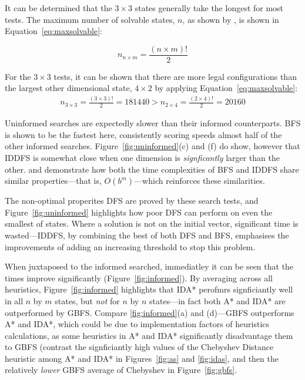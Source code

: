 It can be determined that the $3 \times 3$ states generally take the longest for
most tests. The maximum number of solvable states, $n$, as shown by
\citet{gong2000}, is shown in Equation~\ref{eq:maxsolvable}:

\begin{equation}\label{eq:maxsolvable}
  n_{n \times m} = \frac{(n \times m)!}{2}
\end{equation}

For the $3 \times 3$ tests, it can be shown that there are more legal configurations
than the largest other dimensional state, $4 \times 2$ by applying
Equation~\ref{eq:maxsolvable}:
\begin{align*}\label{eq:3by3larger}
  n_{3 \times 3} = \frac{( 3 \times 3 )!}{2} = 181440 > n_{2 \times 4} = \frac{( 2 \times 4 )!}{2} = 20160
\end{align*}

Uninformed searches are expectedly slower than their informed counterparts. BFS is
shown to be the fastest here, consistently scoring speeds almost half of the
other informed searches. Figure~\ref{fig:uninformed}(c) and (f) do show, however
that IDDFS is somewhat close when one dimension is \emph{signficantly} larger than
the other. \citet{amackworth1998} and \citet{canderson2012} demonstrate how both the time
complexities of BFS and IDDFS share similar properties---that is, $O(b^{m})$---which
reinforces these similarities.

The non-optimal properites DFS are proved by these search tests, and Figure~\ref{fig:uninformed}
highlights how poor DFS can perform on even the smallest of states. Where a solution
is not on the initial vector, significant time is wasted---IDDFS, by combining
the best of both DFS and BFS, emphasises the improvements of adding an increasing
threshold to stop this problem.

When juxtaposed to the informed searched, immediatley it can be seen that the times
improve significantly (Figure~\ref{fig:informed}). By averaging across all heuristics,
Figure~\ref{fig:informed} highlights that IDA* perofmrs signficiantly well in all $n$ by $m$
states, but \emph{not} for $n$ by $n$ states---in fact both A* and IDA* are outperformed
by GBFS. Compare \ref{fig:informed}(a) and (d)---GBFS outperforms A* and IDA*, which
could be due to implementation factors of heuristics calculations, as some heuristics
in A* and IDA* significantly disadvantage them to GBFS (contrast the signficiantly
high values of the Chebyshev Distance heuristic among A* and IDA* in Figures~\ref{fig:as}
and \ref{fig:idas}, and then the relatively \emph{lower} GBFS average of Chebyshev in
Figure~\ref{fig:gbfs}.

